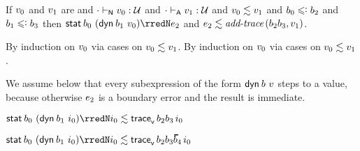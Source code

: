 \begin{lemma}\label{H-stadyn-A-bndbnd}
  If\/ $v_0$ and\/ $v_1$ are \reducedsurfaceexpressions{}
  and\/ ${\cdot} \vdash_{\mathsf{N}} v_0 : {\mathcal U}$
  and\/ ${\cdot} \vdash_{\mathsf{A}} v_1 : {\mathcal U}$
  and\/ $v_0 \lesssim v_1$
  and\/ $\sbnd_0 \subteq \sbnd_2$
  and\/ $\sbnd_1 \subteq \sbnd_3$
  then\/ $\estab{\sbnd_0}{(\edynb{\sbnd_1}{\svalue_0})} \rredN \sexpr_2$
  and\/ $e_2 \lesssim \textit{add\textsf{-}trace}\,(b_2  b_3, v_1)$.
\end{lemma}{
  \newcommand{\shortpf}{By induction on $\svalue_0$ via cases on $\rexpr{\svalue_0}{\svalue_1}$.}
\begin{lamportproof*}
  \shortpf
\mainproof
  \shortpf

  We assume below that every subexpression of the form $\mathsf{dyn}^{}\,b~v$ steps to a value, because otherwise $e_2$ is a boundary error and the result is immediate.

    \begin{pfproof}
      \qedstep
        \begin{pfproof}
          $\estab{\sbnd_0}{(\edynb{\sbnd_1}{\sint_0})} \rredN \rexpr{\sint_0}{\ehist{\fconcat{\sbnd_2}{\sbnd_3}}{\sint_0}}$
        \end{pfproof}
    \end{pfproof}

    \begin{pfproof}
      \qedstep
        \begin{pfproof}
          $\estab{\sbnd_0}{(\edynb{\sbnd_1}{\sint_0})} \rredN \rexpr{\sint_0}{\ehist{\fconcat{\sbnd_2}{\fconcat{\sbnd_3}{\sblist_4}}}{\sint_0}}$
        \end{pfproof}
    \end{pfproof}


\end{lamportproof*}}
